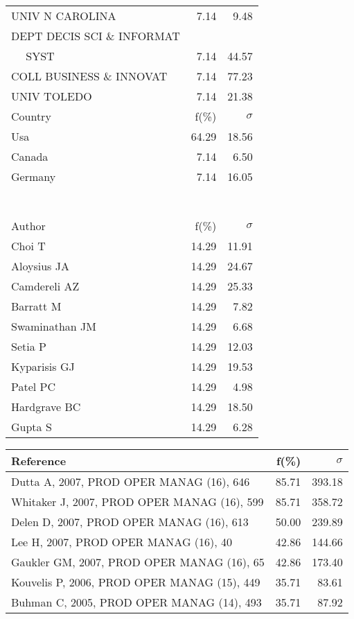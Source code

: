 \documentclass[a4paper,11pt]{report}
\begin{document}
\begin{landscape}
\begin{table}[!ht]
{\begin{tabular}{|l r r|}
UNIV N CAROLINA & 7.14 & 9.48\\
DEPT DECIS SCI \& INFORMAT &  & \\
$\quad$ SYST & 7.14 & 44.57\\
COLL BUSINESS \& INNOVAT & 7.14 & 77.23\\
UNIV TOLEDO & 7.14 & 21.38\\
\hline
\hline
Country & f(\%) & $\sigma$\\
\hline
Usa & 64.29 & 18.56\\
Canada & 7.14 & 6.50\\
Germany & 7.14 & 16.05\\
 &  & \\
 &  & \\
 &  & \\
 &  & \\
 &  & \\
 &  & \\
 &  & \\
\hline
\hline
Author & f(\%) & $\sigma$\\
\hline
Choi T & 14.29 & 11.91\\
Aloysius JA & 14.29 & 24.67\\
Camdereli AZ & 14.29 & 25.33\\
Barratt M & 14.29 & 7.82\\
Swaminathan JM & 14.29 & 6.68\\
Setia P & 14.29 & 12.03\\
Kyparisis GJ & 14.29 & 19.53\\
Patel PC & 14.29 & 4.98\\
Hardgrave BC & 14.29 & 18.50\\
Gupta S & 14.29 & 6.28\\
\hline
\end{tabular}
}
{\scriptsize\begin{tabular}{|l r r|}
\hline
Reference & f(\%) & $\sigma$\\
\hline
Dutta A, 2007, PROD OPER MANAG (16), 646 & 85.71 & 393.18\\
Whitaker J, 2007, PROD OPER MANAG (16), 599 & 85.71 & 358.72\\
Delen D, 2007, PROD OPER MANAG (16), 613 & 50.00 & 239.89\\
Lee H, 2007, PROD OPER MANAG (16), 40 & 42.86 & 144.66\\
Gaukler GM, 2007, PROD OPER MANAG (16), 65 & 42.86 & 173.40\\
Kouvelis P, 2006, PROD OPER MANAG (15), 449 & 35.71 & 83.61\\
Buhman C, 2005, PROD OPER MANAG (14), 493 & 35.71 & 87.92\\

\end{tabular}}
\end{table}
\end{landscape}
\end{document}

